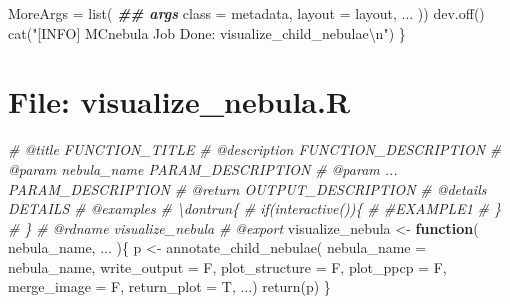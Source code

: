 \documentclass[
]{article}
\newenvironment{Shaded}{\begin{snugshade}}{\end{snugshade}}
\newcommand{\AttributeTok}[1]{\textcolor[rgb]{0.77,0.63,0.00}{#1}}
\newcommand{\CommentTok}[1]{\textcolor[rgb]{0.56,0.35,0.01}{\textit{#1}}}
\newcommand{\ControlFlowTok}[1]{\textcolor[rgb]{0.13,0.29,0.53}{\textbf{#1}}}
\newcommand{\DocumentationTok}[1]{\textcolor[rgb]{0.56,0.35,0.01}{\textbf{\textit{#1}}}}
\newcommand{\FunctionTok}[1]{\textcolor[rgb]{0.00,0.00,0.00}{#1}}
\newcommand{\NormalTok}[1]{#1}
\newcommand{\OtherTok}[1]{\textcolor[rgb]{0.56,0.35,0.01}{#1}}
\newcommand{\SpecialCharTok}[1]{\textcolor[rgb]{0.00,0.00,0.00}{#1}}
\newcommand{\StringTok}[1]{\textcolor[rgb]{0.31,0.60,0.02}{#1}}
\begin{document}
\begin{Shaded}
\begin{Highlighting}[]
                      \AttributeTok{MoreArgs =} \FunctionTok{list}\NormalTok{( }\DocumentationTok{\#\# args}
                                      \AttributeTok{class =}\NormalTok{ metadata,}
                                      \AttributeTok{layout =}\NormalTok{ layout,}
\NormalTok{                                      ...}
\NormalTok{                                      ))}
    \FunctionTok{dev.off}\NormalTok{()}
    \FunctionTok{cat}\NormalTok{(}\StringTok{"[INFO] MCnebula Job Done: visualize\_child\_nebulae}\SpecialCharTok{\textbackslash{}n}\StringTok{"}\NormalTok{)}
\NormalTok{  \}}
\end{Highlighting}
\end{Shaded}

\hypertarget{file-visualize_nebula.r}{%
\section{File: visualize\_nebula.R}\label{file-visualize_nebula.r}}

\begin{Shaded}
\begin{Highlighting}[]
\CommentTok{\#\textquotesingle{} @title FUNCTION\_TITLE}
\CommentTok{\#\textquotesingle{} @description FUNCTION\_DESCRIPTION}
\CommentTok{\#\textquotesingle{} @param nebula\_name PARAM\_DESCRIPTION}
\CommentTok{\#\textquotesingle{} @param ... PARAM\_DESCRIPTION}
\CommentTok{\#\textquotesingle{} @return OUTPUT\_DESCRIPTION}
\CommentTok{\#\textquotesingle{} @details DETAILS}
\CommentTok{\#\textquotesingle{} @examples }
\CommentTok{\#\textquotesingle{} \textbackslash{}dontrun\{}
\CommentTok{\#\textquotesingle{} if(interactive())\{}
\CommentTok{\#\textquotesingle{}  \#EXAMPLE1}
\CommentTok{\#\textquotesingle{}  \}}
\CommentTok{\#\textquotesingle{} \}}
\CommentTok{\#\textquotesingle{} @rdname visualize\_nebula}
\CommentTok{\#\textquotesingle{} @export }
\NormalTok{visualize\_nebula }\OtherTok{\textless{}{-}}
  \ControlFlowTok{function}\NormalTok{(}
\NormalTok{           nebula\_name,}
\NormalTok{           ...}
\NormalTok{           )\{}
\NormalTok{    p }\OtherTok{\textless{}{-}} \FunctionTok{annotate\_child\_nebulae}\NormalTok{(}
                                \AttributeTok{nebula\_name =}\NormalTok{ nebula\_name,}
                                \AttributeTok{write\_output =}\NormalTok{ F,}
                                \AttributeTok{plot\_structure =}\NormalTok{ F,}
                                \AttributeTok{plot\_ppcp =}\NormalTok{ F,}
                                \AttributeTok{merge\_image =}\NormalTok{ F,}
                                \AttributeTok{return\_plot =}\NormalTok{ T,}
\NormalTok{                                ...)}
    \FunctionTok{return}\NormalTok{(p)}
\NormalTok{  \}}
\end{Highlighting}
\end{Shaded}
\end{document}
